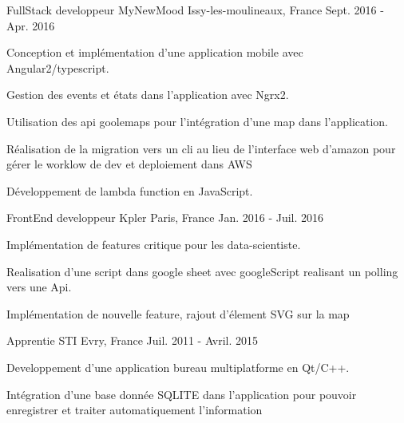 \begin{cventries}
  \cventry
    {FullStack developpeur} %
    {MyNewMood} %
    {Issy-les-moulineaux, France} %
    {Sept. 2016 - Apr. 2016} %
    {
      \begin{cvitems} %
        \item {Conception et implémentation d'une application mobile avec Angular2/typescript.}
        \item {Gestion des events et états dans l'application avec Ngrx2.}
        \item {Utilisation des api goolemaps pour l'intégration d'une map dans l'application.}
        \item {Réalisation de la migration vers un cli au lieu de l'interface web d'amazon pour gérer le worklow de dev et deploiement dans AWS}
        \item {Développement de lambda function en JavaScript.}
      \end{cvitems}
    }

  \cventry
    {FrontEnd developpeur} %
    {Kpler} %
    {Paris, France} %
    {Jan. 2016 - Juil. 2016} %
    {
      \begin{cvitems} %
        \item {Implémentation de features critique pour les data-scientiste.}
        \item {Realisation d'une script dans google sheet avec googleScript realisant un polling vers une Api.}
        \item {Implémentation de nouvelle feature, rajout d'élement SVG sur la map}
      \end{cvitems}
    }

  \cventry
    {Apprentie} %
    {STI} %
    {Evry, France} %
    {Juil. 2011 - Avril. 2015} %
    {
      \begin{cvitems} %
        \item {Developpement d'une application bureau multiplatforme en Qt/C++.}
        \item {Intégration d'une base donnée SQLITE dans l'application pour pouvoir enregistrer et traiter automatiquement l'information}
      \end{cvitems}
    }
\end{cventries}
